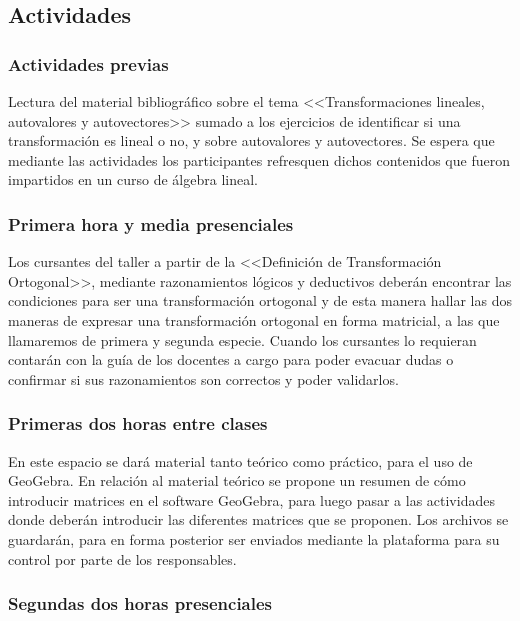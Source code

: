 \subsection{Actividades}

\subsubsection{Actividades previas}

Lectura del material bibliográfico sobre el tema <<Transformaciones lineales, autovalores y autovectores>> sumado a los ejercicios de identificar si una transformación es lineal o no, y sobre autovalores y autovectores. Se espera que mediante las actividades los participantes refresquen dichos contenidos que fueron impartidos en un curso de álgebra lineal.

\subsubsection{Primera hora y media presenciales}\label{subsec:Primeras-dos-sinc-03}

Los cursantes del taller a partir de la <<Definición de Transformación Ortogonal>>, mediante razonamientos lógicos y deductivos deberán encontrar las condiciones para ser una transformación ortogonal y de esta manera hallar las dos maneras de expresar una transformación ortogonal en forma matricial, a las que llamaremos de primera y segunda especie. Cuando los cursantes lo requieran contarán con la guía de los docentes a cargo para poder evacuar dudas o confirmar si sus razonamientos son correctos y poder validarlos.

\subsubsection{Primeras dos horas entre clases}\label{subsec:Primeras-dos-EC-03}

En este espacio se dará material tanto teórico como práctico, para el uso de GeoGebra. En relación al material teórico se propone un resumen de cómo introducir matrices en el software GeoGebra, para luego pasar a las actividades donde deberán introducir las diferentes matrices que se proponen. Los archivos se guardarán, para en forma posterior ser enviados mediante la plataforma para su control por parte de los responsables.

\subsubsection{Segundas dos horas presenciales}

